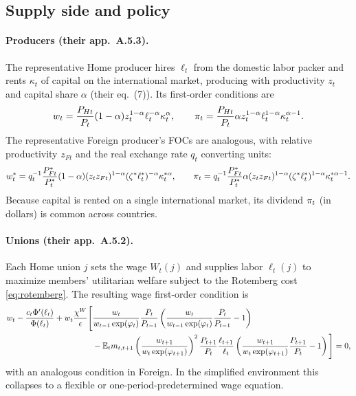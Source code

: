\subsection{Supply side and policy}
\label{sec:supply-policy}

\paragraph{Producers (their app.\ A.5.3).} The representative Home producer hires
$\ell_t$ from the domestic labor packer and rents $\kappa_t$ of capital on the
international market, producing with productivity $z_t$ and capital share
$\alpha$ (their eq.~(7)). Its first-order conditions are
\begin{equation}
\label{eq:prod-foc-home}
w_t=\frac{P_{Ht}}{P_t}(1-\alpha)z_t^{1-\alpha}\ell_t^{-\alpha}\kappa_t^{\alpha},
\qquad
\pi_t=\frac{P_{Ht}}{P_t}\alpha z_t^{1-\alpha}\ell_t^{1-\alpha}\kappa_t^{\alpha-1}.
\end{equation}
The representative Foreign producer's FOCs are analogous, with relative
productivity $z_{Ft}$ and the real exchange rate $q_t$ converting units:
\begin{equation}
\label{eq:prod-foc-foreign}
w_t^{*}=q_t^{-1}\frac{P^{*}_{Ft}}{P^{*}_t}(1-\alpha)(z_t z_{Ft})^{1-\alpha}
(\zeta^{*}\ell_t^{*})^{-\alpha}\kappa_t^{*\alpha},\qquad
\pi_t=q_t^{-1}\frac{P^{*}_{Ft}}{P^{*}_t}\alpha(z_t z_{Ft})^{1-\alpha}
(\zeta^{*}\ell_t^{*})^{1-\alpha}\kappa_t^{*\alpha-1}.
\end{equation}
Because capital is rented on a single international market, its dividend
$\pi_t$ (in dollars) is common across countries.

\paragraph{Unions (their app.\ A.5.2).} Each Home union $j$ sets the wage
$W_t(j)$ and supplies labor $\ell_t(j)$ to maximize members' utilitarian
welfare subject to the Rotemberg cost \eqref{eq:rotemberg}. The resulting wage
first-order condition is
\begin{equation}
\label{eq:union-foc}
\begin{aligned}
w_t-\frac{c_t\Phi'(\ell_t)}{\Phi(\ell_t)}
+w_t\frac{\chi^{W}}{\epsilon}\Bigg[
&\frac{w_t}{w_{t-1}\exp(\varphi_t)}\frac{P_t}{P_{t-1}}
\left(\frac{w_t}{w_{t-1}\exp(\varphi_t)}\frac{P_t}{P_{t-1}}-1\right)\\
&-\mathbb{E}_t m_{t,t+1}\left(\frac{w_{t+1}}{w_t\exp(\varphi_{t+1})}\right)^{2}
\frac{P_{t+1}}{P_t}\frac{\ell_{t+1}}{\ell_t}
\left(\frac{w_{t+1}}{w_t\exp(\varphi_{t+1})}\frac{P_{t+1}}{P_t}-1\right)
\Bigg]=0,
\end{aligned}
\end{equation}
with an analogous condition in Foreign. In the simplified environment this
collapses to a flexible or one-period-predetermined wage equation.


